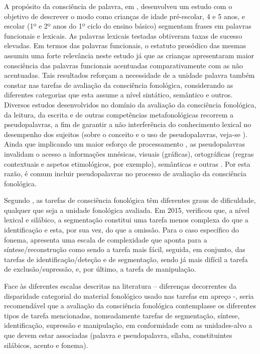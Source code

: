 \documentclass[output=paper,colorlinks,citecolor=brown,booklanguage=portuguese]{langscibook}
\begin{document}
A propósito da consciência de palavra, em \citeyear{Cardoso2011}, \citeauthor{Cardoso2011} desenvolveu um estudo com o objetivo de descrever o modo como crianças de idade pré-escolar, 4 e 5 anos, e escolar (1º e 2º anos do 1º ciclo do ensino básico) segmentam frases em palavras funcionais e lexicais. As palavras lexicais testadas obtiveram taxas de sucesso elevadas. Em termos das palavras funcionais, o estatuto prosódico das mesmas assumiu uma forte relevância neste estudo já que as crianças apresentaram maior consciência das palavras funcionais acentuadas comparativamente com as não acentuadas. Tais resultados reforçam a necessidade de a unidade palavra também constar nas tarefas de avaliação da consciência fonológica, considerando as diferentes categorias que esta assume a nível sintático, semântico e outros.
Diversos estudos desenvolvidos no domínio da avaliação da consciência fonológica, da leitura, da escrita e de outras competências metafonológicas recorrem a pseudopalavras, a fim de garantir a não interferência do conhecimento lexical no desempenho dos sujeitos (sobre o conceito e o uso de pseudopalavras, veja-se ). Ainda que implicando um maior esforço de processamento \citep{Moojen2009}, as pseudopalavras invalidam o acesso a informações mnésicas, visuais (gráficas), ortográficas (regras contextuais e aspetos etimológicos, por exemplo), semânticas e outras \citep{Grainger2003}. Por esta razão, é comum incluir pseudopalavras no processo de avaliação da consciência fonológica.

Segundo \citet{Chard1999}, as tarefas de consciência fonológica têm diferentes graus de dificuldade, qualquer que seja a unidade fonológica avaliada. Em 2015, \citeauthor{Afonso2015} verificou que, a nível lexical e silábico, a segmentação constitui uma tarefa menos complexa do que a identificação e esta, por sua vez, do que a omissão. Para o caso específico do fonema, \citet{Alves2012} apresenta uma escala de complexidade que aponta para a síntese/reconstrução como sendo a tarefa mais fácil, seguida, em conjunto, das tarefas de identificação/deteção e de segmentação, sendo já mais difícil a tarefa de exclusão/supressão, e, por último, a tarefa de manipulação.

Face às diferentes escalas descritas na literatura – diferenças decorrentes da disparidade categorial do material fonológico usado nas tarefas em apreço -, seria recomendável que a avaliação da consciência fonológica contemplasse os diferentes tipos de tarefa mencionadas, nomeadamente tarefas de segmentação, síntese, identificação, supressão e manipulação, em conformidade com as unidades-alvo a que devem estar associadas (palavra e pseudopalavra, sílaba, constituintes silábicos, acento e fonema). 
\end{document}
